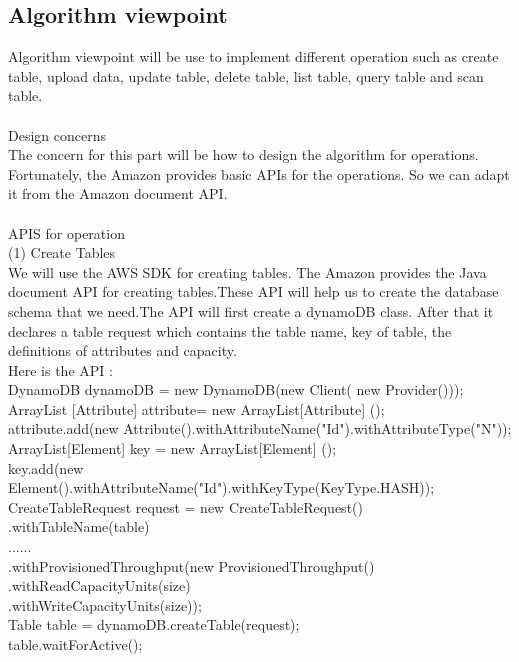     \subsection{Algorithm viewpoint}
    Algorithm viewpoint will be use to implement different operation such as create table, upload data, update table, delete table, list table, query table and scan table.\\
\\
    Design concerns\\
    The concern for this part will be how to design the algorithm for operations. Fortunately, the Amazon provides basic APIs for the operations. So we can adapt it from the Amazon document API.\\
\\
    APIS for operation\\
    (1) Create Tables\\
    We will use the AWS SDK for creating tables. The Amazon provides the Java document API for creating tables.These API will help us to create the database schema that we need.The API will first create a dynamoDB class. After that it declares a table request which contains the table name, key of table, the definitions of attributes and capacity.\\
    Here is the API\cite{w1} :\\
    DynamoDB dynamoDB = new DynamoDB(new Client(
    new Provider()));\\
    ArrayList [Attribute] attribute= new ArrayList[Attribute] ();\\
    attribute.add(new Attribute().withAttributeName("Id").withAttributeType("N"));\\
    ArrayList[Element] key = new ArrayList[Element] ();\\
 key.add(new  Element().withAttributeName("Id").withKeyType(KeyType.HASH));\\
CreateTableRequest request = new CreateTableRequest()\\
.withTableName(table)\\
......\\
.withProvisionedThroughput(new ProvisionedThroughput()\\
            .withReadCapacityUnits(size)\\
            .withWriteCapacityUnits(size));\\
    Table table = dynamoDB.createTable(request);\\
    table.waitForActive();\\
\\
